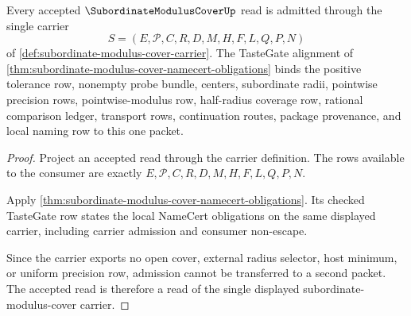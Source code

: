 \begin{theorem}
\label{thm:subordinate-modulus-cover-carrier-obligation}
Every accepted $\SubordinateModulusCoverUp$ read is admitted through the single carrier
$$
S=(E,\mathcal{P},C,R,D,M,H,F,L,Q,P,N)
$$
of \autoref{def:subordinate-modulus-cover-carrier}. The TasteGate alignment of \autoref{thm:subordinate-modulus-cover-namecert-obligations} binds the positive tolerance row, nonempty probe bundle, centers, subordinate radii, pointwise precision rows, pointwise-modulus row, half-radius coverage row, rational comparison ledger, transport rows, continuation routes, package provenance, and local naming row to this one packet.
\end{theorem}
\begin{proof}
Project an accepted read through the carrier definition. The rows available to the consumer are exactly $E,\mathcal{P},C,R,D,M,H,F,L,Q,P,N$.

Apply \autoref{thm:subordinate-modulus-cover-namecert-obligations}. Its checked TasteGate row states the local NameCert obligations on the same displayed carrier, including carrier admission and consumer non-escape.

Since the carrier exports no open cover, external radius selector, host minimum, or uniform precision row, admission cannot be transferred to a second packet. The accepted read is therefore a read of the single displayed subordinate-modulus-cover carrier.
\end{proof}

